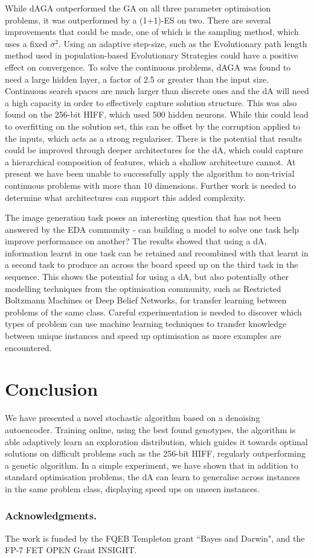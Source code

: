 \documentclass[runningheads,a4paper]{llncs}
\begin{document}
While dAGA outperformed the GA on all three parameter optimisation problems, it was outperformed by a (1+1)-ES on two. There are several improvements that could be made, one of which is the sampling method, which uses a fixed \(\sigma^2\). Using an adaptive step-size, such as the Evolutionary path length method used in population-based Evolutionary Strategies could have a positive effect on convergence. To solve the continuous problems, dAGA was found to need a large hidden layer, a factor of 2.5 or greater than the input size. Continuous search spaces are much larger than discrete ones and the dA will need a high capacity in order to effectively capture solution structure. This was also found on the 256-bit HIFF, which used 500 hidden neurons. While this could lead to overfitting on the solution set, this can be offset by the corruption applied to the inputs, which acts as a strong regulariser. There is the potential that results could be improved through deeper architectures for the dA, which could capture a hierarchical composition of features, which a shallow architecture cannot. At present we have been unable to successfully apply the algorithm to non-trivial continuous problems with more than 10 dimensions. Further work is needed to determine what architectures can support this added complexity. 

The image generation task poses an interesting question that has not been answered by the EDA community - can building a model to solve one task help improve performance on another? The results showed that using a dA, information learnt in one task can be retained and recombined with that learnt in a second task to produce an across the board speed up on the third task in the sequence. This shows the potential for using a dA, but also potentially other modelling techniques from the optimisation community, such as Restricted Boltzmann Machines or Deep Belief Networks, for transfer learning between problems of the same class. Careful experimentation is needed to discover which types of problem can use machine learning techniques to transfer knowledge between unique instances and speed up optimisation as more examples are encountered.

\section{Conclusion}
We have presented a novel stochastic algorithm based on a denoising autoencoder. Training online, using the best found genotypes, the algorithm is able adaptively learn an exploration distribution, which guides it towards optimal solutions on difficult problems such as the 256-bit HIFF, regularly outperforming a genetic algorithm. In a simple experiment, we have shown that in addition to standard optimisation problems, the dA can learn to generalise across instances in the same problem class, displaying speed ups on unseen instances. 
\subsubsection*{Acknowledgments.} The work is funded by the FQEB Templeton grant ``Bayes and Darwin", and the FP-7 FET OPEN Grant INSIGHT.



\end{document}
